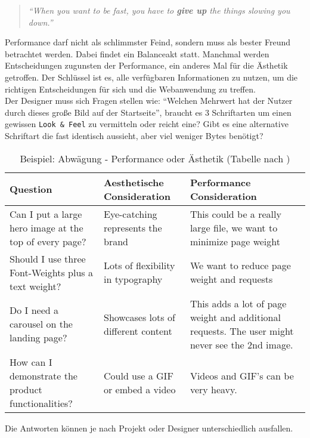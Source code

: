 			\begin{quote}
				\textit{"`When you want to be fast, you have to \textbf{give up} the things slowing you down."'}\autocite[p. 2]{osmani14}
			\end{quote}

			Performance darf nicht als schlimmster Feind, sondern muss als bester Freund betrachtet werden. Dabei findet ein Balanceakt statt. Manchmal werden Entscheidungen zugunsten der Performance, ein anderes Mal für die Ästhetik getroffen. Der Schlüssel ist es, alle verfügbaren Informationen zu nutzen, um die richtigen Entscheidungen für sich und die Webanwendung zu treffen.\autocite[p. 126]{laraHogan14}\\
			Der Designer muss sich Fragen stellen wie: "`Welchen Mehrwert hat der Nutzer durch dieses große Bild auf der Startseite"', braucht es 3 Schriftarten um einen gewissen \texttt{Look \& Feel} zu vermitteln oder reicht eine? Gibt es eine alternative Schriftart die fast identisch aussieht, aber viel weniger Bytes benötigt? 

			\begin{longtable}{|>{\raggedright \arraybackslash}p{4.9cm}|>{\raggedright \arraybackslash}p{4.9cm}|>{\raggedright \arraybackslash}p{5cm}|}
			\caption{Beispiel: Abwägung - Performance oder Ästhetik  (Tabelle nach \autocite[p. 126]{laraHogan14})}\\
			\hline
				\textbf{Question} & \textbf{Aesthetische Consideration} & \textbf{Performance Consideration}\\
				\hline
				Can I put a large hero image at the top of every page? & Eye-catching represents the brand & This could be a really large file, we want to minimize page weight\\
				\hline
				Should I use three Font-Weights plus a text weight? & Lots of flexibility in typography & We want to reduce page weight and requests\\
				\hline
				Do I need a carousel on the landing page? & Showcases lots of different content & This adds a lot of page weight and additional requests. The user might never see the 2nd image.\\
				\hline
				How can I demonstrate the product functionalities? & Could use a GIF or embed a video & Videos and GIF's can be very heavy.\\
				\hline
			\end{longtable}

			Die Antworten können je nach Projekt oder Designer unterschiedlich ausfallen.

